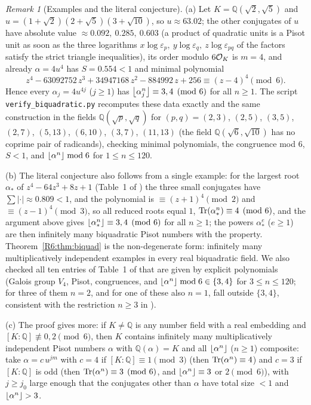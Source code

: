 \documentclass[11pt]{amsart}
\theoremstyle{definition}
\theoremstyle{remark}
\newtheorem{remark}[theorem]{Remark}
\providecommand{\Q}{\mathbb Q}
\begin{document}
\begin{remark}[Examples and the literal conjecture]\label{R6:rem:explicit}
(a) Let $K=\Q(\sqrt2,\sqrt5)$ and $u=(1+\sqrt2)(2+\sqrt5)(3+\sqrt{10})$, so $u\approx63.02$; the
other conjugates of $u$ have absolute value $\approx0.092,\ 0.285,\ 0.603$ (a product of quadratic units is a
Pisot unit as soon as the three logarithms $x\log\varepsilon_p,\ y\log\varepsilon_q,\ z\log\varepsilon_{pq}$
of the factors satisfy the strict triangle inequalities), its order modulo $6\mathcal{O}_K$ is $m=4$, and
already $\alpha=4u^4$ has $S=0.554<1$ and minimal polynomial
\[
z^4-63092752\,z^3+34947168\,z^2-884992\,z+256\equiv(z-4)^4\pmod 6 .
\]
Hence every $\alpha_j=4u^{4j}$ ($j\ge1$) has $\left\lfloor \alpha_j^n\right\rfloor\equiv 3,4\pmod 6$ for all $n\ge1$.
The script \texttt{verify\_\allowbreak{}biquadratic.py} recomputes these data exactly and the same construction in
the fields $\Q(\sqrt p,\sqrt q)$ for $(p,q)=(2,3)$, $(2,5)$, $(3,5)$, $(2,7)$, $(5,13)$, $(6,10)$,
$(3,7)$, $(11,13)$ (the field $\Q(\sqrt6,\sqrt{10})$ has no coprime pair of radicands), checking minimal polynomials,
the congruence mod $6$, $S<1$, and $\left\lfloor \alpha^n\right\rfloor\bmod 6$ for $1\le n\le 120$.

(b) The literal conjecture also follows from a single example: for the largest root $\alpha_\ast$ of
$z^4-64z^3+8z+1$ (Table~1 of \cite{R6-HIKK}) the three small conjugates have
$\sum|\cdot|\approx0.809<1$, and the polynomial is $\equiv(z+1)^4\pmod 2$ and $\equiv(z-1)^4\pmod 3$, so
all reduced roots equal $1$, $\operatorname{Tr}(\alpha_\ast^n)\equiv4\pmod 6$, and the argument above gives
$\left\lfloor \alpha_\ast^n\right\rfloor\equiv3,4\pmod 6$ for all $n\ge1$; the powers $\alpha_\ast^e$ ($e\ge1$) are then infinitely many biquadratic Pisot numbers with
the property. Theorem~\ref{R6:thm:biquad} is the non-degenerate form: infinitely many multiplicatively
independent examples in every real biquadratic field. We also checked all ten entries of Table~1 of
\cite{R6-HIKK} that are given by explicit polynomials (Galois group $V_4$, Pisot, congruences, and
$\left\lfloor \alpha^n\right\rfloor\bmod 6\in\{3,4\}$ for $3\le n\le120$; for three of them $n=2$, and for one of these
also $n=1$, fall outside $\{3,4\}$, consistent with the restriction $n\ge3$ in \cite{R6-HIKK}).

(c) The proof gives more: if $K\ne\Q$ is any number field with a real embedding and
$[K:\Q]\not\equiv 0,2\pmod 6$, then $K$ contains infinitely many multiplicatively independent Pisot
numbers $\alpha$ with $\Q(\alpha)=K$ and all $\left\lfloor \alpha^n\right\rfloor$ ($n\ge1$) composite: take
$\alpha=c\,u^{jm}$ with $c=4$ if $[K:\Q]\equiv1\pmod 3$ (then $\operatorname{Tr}(\alpha^n)\equiv 4$) and $c=3$ if
$[K:\Q]$ is odd (then $\operatorname{Tr}(\alpha^n)\equiv3\pmod 6$, and $\left\lfloor \alpha^n\right\rfloor\equiv 3$ or $2\pmod 6$),
with $j\ge j_0$ large enough that the conjugates other than $\alpha$ have total size $<1$ and
$\left\lfloor \alpha^n\right\rfloor>3$.
\end{remark}
\end{document}
